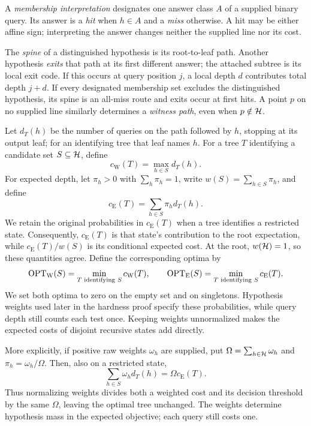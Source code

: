 \begin{definition}\label{def:membership-spine}
A \emph{membership interpretation} designates one answer class $A$
of a supplied binary query. Its answer is a \emph{hit} when $h\in A$
and a \emph{miss} otherwise. A hit may be either affine sign;
interpreting the answer changes neither the supplied line nor its cost.

The \emph{spine} of a distinguished hypothesis is its root-to-leaf
path. Another hypothesis \emph{exits} that path at its first
different answer; the attached subtree is its local exit code.
If this occurs at query position $j$, a local depth $d$ contributes
total depth $j+d$.
If every designated membership set excludes the distinguished
hypothesis, its spine is an all-miss route and exits occur at first hits.
A point $p$ on no supplied line similarly determines a
\emph{witness path}, even when $p\notin\mathcal H$.
\end{definition}

Let $d_T(h)$ be the number of queries on the path followed by $h$,
stopping at its output leaf; for an identifying tree that leaf names $h$.
For a tree $T$ identifying a candidate set $S\subseteq\mathcal H$, define
\[
 c_{\mathrm W}(T)=\max_{h\in S}d_T(h).
\]
For expected depth, let $\pi_h>0$ with $\sum_h\pi_h=1$, write
$w(S)=\sum_{h\in S}\pi_h$, and define
\[
 c_{\mathrm E}(T)=\sum_{h\in S}\pi_h d_T(h).
\]
We retain the original probabilities in $c_{\mathrm E}(T)$ when a tree
identifies a restricted state. Consequently, $c_{\mathrm E}(T)$ is
that state's contribution to the root expectation, while
$c_{\mathrm E}(T)/w(S)$ is its conditional expected cost. At the
root, $w(\mathcal H)=1$, so these quantities agree.
Define the corresponding optima by
\[
 \operatorname{OPT}_{\mathrm W}(S)=\min_{T\text{ identifying }S}c_{\mathrm W}(T),
 \qquad
 \operatorname{OPT}_{\mathrm E}(S)=\min_{T\text{ identifying }S}c_{\mathrm E}(T).
\]
We set both optima to zero on the empty set and on singletons.
Hypothesis weights used later in the hardness proof specify these
probabilities, while query depth still counts each test once. Keeping
weights unnormalized makes the expected costs of disjoint recursive
states add directly.

More explicitly, if positive raw weights $\omega_h$ are supplied,
put $\Omega=\sum_{h\in\mathcal H}\omega_h$ and $\pi_h=\omega_h/\Omega$.
Then, also on a restricted state,
\[
 \sum_{h\in S}\omega_h d_T(h)=\Omega c_{\mathrm E}(T).
\]
Thus normalizing weights divides both a weighted cost and its
decision threshold by the same $\Omega$, leaving the optimal tree
unchanged. The weights determine hypothesis mass in the expected
objective; each query still costs one.

